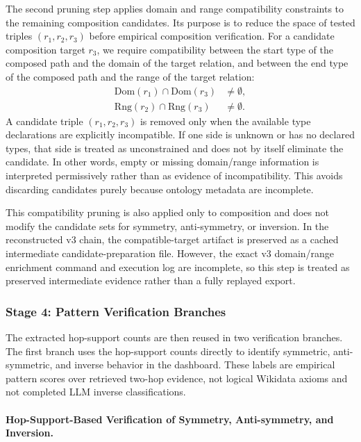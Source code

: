 \documentclass[12pt,a4paper]{article}
\begin{document}
The second pruning step applies domain and range compatibility constraints to the remaining composition candidates. Its purpose is to reduce the space of tested triples $(r_1,r_2,r_3)$ before empirical composition verification. 
For a candidate composition target $r_3$, we require compatibility between the start type of the composed path and the domain of the target relation, and between the end type of the composed path and the range of the target relation:
\[
\begin{aligned}
\mathrm{Dom}(r_1) \cap \mathrm{Dom}(r_3) &\neq \emptyset,\\
\mathrm{Rng}(r_2) \cap \mathrm{Rng}(r_3) &\neq \emptyset.
\end{aligned}
\]
A candidate triple $(r_1,r_2,r_3)$ is removed only when the available type declarations are explicitly incompatible. If one side is unknown or has no declared types, that side is treated as unconstrained and does not by itself eliminate the candidate. In other words, empty or missing domain/range information is interpreted permissively rather than as evidence of incompatibility. This avoids discarding candidates purely because ontology metadata are incomplete.

This compatibility pruning is also applied only to composition and does not modify the candidate sets for symmetry, anti-symmetry, or inversion. In the reconstructed v3 chain, the compatible-target artifact is preserved as a cached intermediate candidate-preparation file. However, the exact v3 domain/range enrichment command and execution log are incomplete, so this step is treated as preserved intermediate evidence rather than a fully replayed export.

\subsubsection{Stage 4: Pattern Verification Branches} 
The extracted hop-support counts are then reused in two verification branches. 
The first branch uses the hop-support counts directly to identify symmetric, anti-symmetric, and inverse behavior in the dashboard. These labels are empirical pattern scores over retrieved two-hop evidence, not logical Wikidata axioms and not completed LLM inverse classifications.

\paragraph{Hop-Support-Based Verification of Symmetry, Anti-symmetry, and Inversion.}
\end{document}
